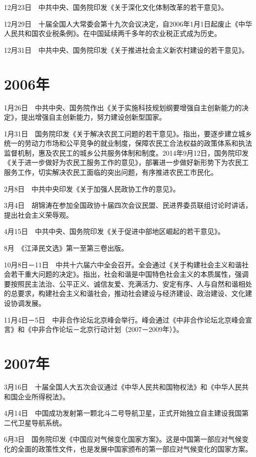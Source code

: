 \documentclass[10pt,a4paper,twocolumn]{book}
\begin{document}
12月23日　中共中央、国务院印发《关于深化文化体制改革的若干意见》。

12月29日　十届全国人大常委会第十九次会议决定，自2006年1月1日起废止《中华人民共和国农业税条例》。在中国延续两千多年的农业税正式成为历史。

12月31日　中共中央、国务院印发《关于推进社会主义新农村建设的若干意见》。

\section{2006年}

1月26日　中共中央、国务院作出《关于实施科技规划纲要增强自主创新能力的决定》，提出增强自主创新能力，努力建设创新型国家。

1月31日　国务院印发《关于解决农民工问题的若干意见》。指出，要逐步建立城乡统一的劳动力市场和公平竞争的就业制度，保障农民工合法权益的政策体系和执法监督机制，惠及农民工的城乡公共服务体制和制度。2014年9月12日，国务院印发《关于进一步做好为农民工服务工作的意见》，部署进一步做好新形势下为农民工服务工作，切实解决农民工面临的突出问题，有序推进农民工市民化。

2月8日　中共中央印发《关于加强人民政协工作的意见》。

3月4日　胡锦涛在参加全国政协十届四次会议民盟、民进界委员联组讨论时讲话，提出社会主义荣辱观。

4月15日　中共中央、国务院印发《关于促进中部地区崛起的若干意见》。

8月　《江泽民文选》第一至第三卷出版。

10月8日－11日　中共十六届六中全会召开。全会通过《关于构建社会主义和谐社会若干重大问题的决定》。指出，社会和谐是中国特色社会主义的本质属性，强调要按照民主法治、公平正义、诚信友爱、充满活力、安定有序、人与自然和谐相处的总要求，构建社会主义和谐社会，推动社会建设与经济建设、政治建设、文化建设协调发展。

11月4日－5日　中非合作论坛北京峰会举行。峰会通过《中非合作论坛北京峰会宣言》和《中非合作论坛－北京行动计划（2007－2009年）》。

\section{2007年}

3月16日　十届全国人大五次会议通过《中华人民共和国物权法》和《中华人民共和国企业所得税法》。

4月14日　中国成功发射第一颗北斗二号导航卫星，正式开始独立自主建设我国第二代卫星导航系统。

6月3日　国务院印发《中国应对气候变化国家方案》。这是中国第一部应对气候变化的全面的政策性文件，也是发展中国家颁布的第一部应对气候变化的国家方案。
\end{document}
